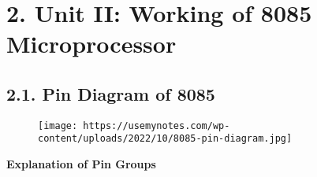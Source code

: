 \documentclass[
]{article}
\begin{document}
\hypertarget{2-unit-ii-working-of-8085-microprocessor}{%
\section{2. Unit II: Working of 8085
Microprocessor}\label{2-unit-ii-working-of-8085-microprocessor}}

\hypertarget{21-pin-diagram-of-8085}{%
\subsection{2.1. Pin Diagram of 8085}\label{21-pin-diagram-of-8085}}

\begin{figure}
\centering
\texttt{[image: https://usemynotes.com/wp-content/uploads/2022/10/8085-pin-diagram.jpg]}
\caption{}
\end{figure}

\textbf{Explanation of Pin Groups}
\end{document}
